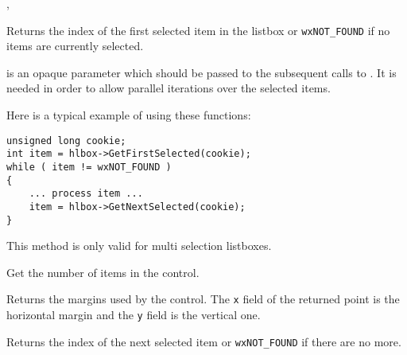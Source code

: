 
, 


\label{wxvlistboxgetfirstselected}


Returns the index of the first selected item in the listbox or
{\tt wxNOT\_FOUND} if no items are currently selected.

 is an opaque parameter which should be passed to the subsequent
calls to . It is needed in
order to allow parallel iterations over the selected items.

Here is a typical example of using these functions:
\begin{verbatim}
unsigned long cookie;
int item = hlbox->GetFirstSelected(cookie);
while ( item != wxNOT_FOUND )
{
    ... process item ...
    item = hlbox->GetNextSelected(cookie);
}
\end{verbatim}

This method is only valid for multi selection listboxes.


\label{wxvlistboxgetitemcount}


Get the number of items in the control.




\label{wxvlistboxgetmargins}


Returns the margins used by the control. The {\tt x} field of the returned
point is the horizontal margin and the {\tt y} field is the vertical one.




\label{wxvlistboxgetnextselected}


Returns the index of the next selected item or {\tt wxNOT\_FOUND} if there are
no more.

